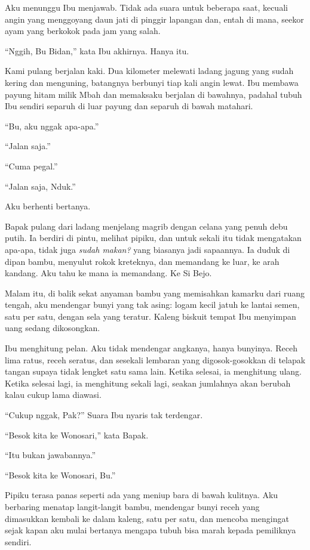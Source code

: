 \documentclass[11pt,twoside,openany]{book}
\makeatletter
\newcommand{\scenebreak}{\par\vspace{0.9em}{\centering\textsc{*\hspace{0.7em}*\hspace{0.7em}*}\par}\vspace{0.9em}\@afterindentfalse\@afterheading}
\makeatother
\begin{document}
Aku menunggu Ibu menjawab. Tidak ada suara untuk beberapa saat, kecuali angin yang menggoyang daun jati di pinggir lapangan dan, entah di mana, seekor ayam yang berkokok pada jam yang salah.

``Nggih, Bu Bidan,'' kata Ibu akhirnya. Hanya itu.

\scenebreak
Kami pulang berjalan kaki. Dua kilometer melewati ladang jagung yang sudah kering dan menguning, batangnya berbunyi tiap kali angin lewat. Ibu membawa payung hitam milik Mbah dan memaksaku berjalan di bawahnya, padahal tubuh Ibu sendiri separuh di luar payung dan separuh di bawah matahari.

``Bu, aku nggak apa-apa.''

``Jalan saja.''

``Cuma pegal.''

``Jalan saja, Nduk.''

Aku berhenti bertanya.

Bapak pulang dari ladang menjelang magrib dengan celana yang penuh debu putih. Ia berdiri di pintu, melihat pipiku, dan untuk sekali itu tidak mengatakan apa-apa, tidak juga \emph{sudah makan?} yang biasanya jadi sapaannya. Ia duduk di dipan bambu, menyulut rokok kreteknya, dan memandang ke luar, ke arah kandang. Aku tahu ke mana ia memandang. Ke Si Bejo.

Malam itu, di balik sekat anyaman bambu yang memisahkan kamarku dari ruang tengah, aku mendengar bunyi yang tak asing: logam kecil jatuh ke lantai semen, satu per satu, dengan sela yang teratur. Kaleng biskuit tempat Ibu menyimpan uang sedang dikosongkan.

Ibu menghitung pelan. Aku tidak mendengar angkanya, hanya bunyinya. Receh lima ratus, receh seratus, dan sesekali lembaran yang digosok-gosokkan di telapak tangan supaya tidak lengket satu sama lain. Ketika selesai, ia menghitung ulang. Ketika selesai lagi, ia menghitung sekali lagi, seakan jumlahnya akan berubah kalau cukup lama diawasi.

``Cukup nggak, Pak?'' Suara Ibu nyaris tak terdengar.

``Besok kita ke Wonosari,'' kata Bapak.

``Itu bukan jawabannya.''

``Besok kita ke Wonosari, Bu.''

Pipiku terasa panas seperti ada yang meniup bara di bawah kulitnya. Aku berbaring menatap langit-langit bambu, mendengar bunyi receh yang dimasukkan kembali ke dalam kaleng, satu per satu, dan mencoba mengingat sejak kapan aku mulai bertanya mengapa tubuh bisa marah kepada pemiliknya sendiri.
\end{document}
